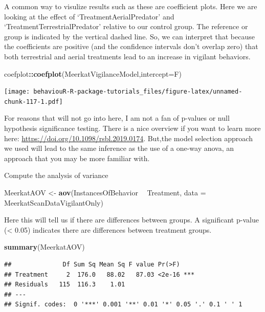 \documentclass[]{book}
\newenvironment{Shaded}{\begin{snugshade}}{\end{snugshade}}
\newcommand{\DataTypeTok}[1]{\textcolor[rgb]{0.13,0.29,0.53}{#1}}
\newcommand{\KeywordTok}[1]{\textcolor[rgb]{0.13,0.29,0.53}{\textbf{#1}}}
\newcommand{\NormalTok}[1]{#1}
\newcommand{\OperatorTok}[1]{\textcolor[rgb]{0.81,0.36,0.00}{\textbf{#1}}}
\newcommand{\StringTok}[1]{\textcolor[rgb]{0.31,0.60,0.02}{#1}}
\begin{document}
A common way to visulize results such as these are coefficient plots. Here we are looking at the effect of `TreatmentAerialPredator' and `TreatmentTerrestrialPredator' relative to our control group. The reference or group is indicated by the vertical dashed line. So, we can interpret that because the coefficients are positive (and the confidence intervals don't overlap zero) that both terrestrial and aerial treatments lead to an increase in vigilant behaviors.

\begin{Shaded}
\begin{Highlighting}[]
\NormalTok{coefplot}\OperatorTok{::}\KeywordTok{coefplot}\NormalTok{(MeerkatVigilanceModel,}\DataTypeTok{intercept=}\NormalTok{F)}
\end{Highlighting}
\end{Shaded}

\texttt{[image: behaviouR-R-package-tutorials\_files/figure-latex/unnamed-chunk-117-1.pdf]}

For reasons that will not go into here, I am not a fan of p-values or null hypothesis significance testing. There is a nice overview if you want to learn more here: \url{https://doi.org/10.1098/rsbl.2019.0174}. But,the model selection approach we used will lead to the same inference as the use of a one-way anova, an approach that you may be more familiar with.

Compute the analysis of variance

\begin{Shaded}
\begin{Highlighting}[]
\NormalTok{MeerkatAOV <-}\StringTok{ }\KeywordTok{aov}\NormalTok{(InstancesOfBehavior }\OperatorTok{~}\StringTok{ }\NormalTok{Treatment, }\DataTypeTok{data =}\NormalTok{ MeerkatScanDataVigilantOnly)}
\end{Highlighting}
\end{Shaded}

Here this will tell us if there are differences between groups. A significant p-value (\textless{} 0.05) indicates there are differences between treatment groups.

\begin{Shaded}
\begin{Highlighting}[]
\KeywordTok{summary}\NormalTok{(MeerkatAOV)}
\end{Highlighting}
\end{Shaded}

\begin{verbatim}
##              Df Sum Sq Mean Sq F value Pr(>F)    
## Treatment     2  176.0   88.02   87.03 <2e-16 ***
## Residuals   115  116.3    1.01                   
## ---
## Signif. codes:  0 '***' 0.001 '**' 0.01 '*' 0.05 '.' 0.1 ' ' 1
\end{verbatim}
\end{document}
